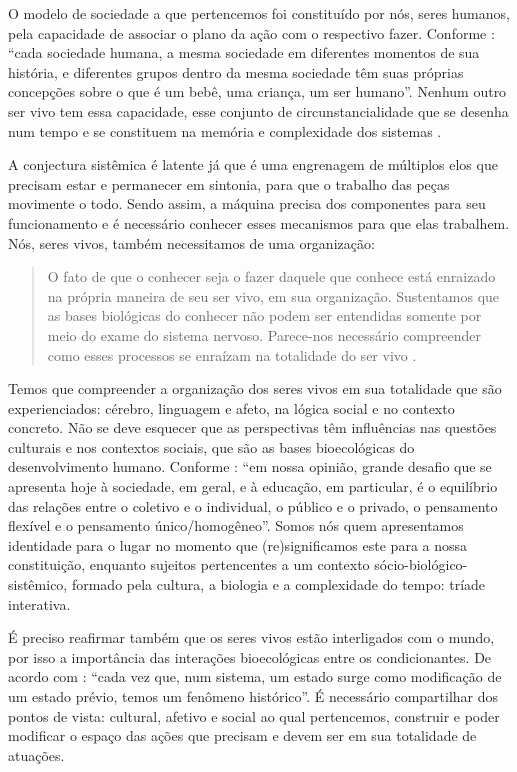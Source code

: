\documentclass{textolivre-html}
\begin{document}
O modelo de sociedade a que pertencemos foi constituído por nós, seres humanos, pela capacidade de associar o plano da ação com o respectivo fazer. Conforme \textcite[p. 91]{carvalho2012}: “cada sociedade humana, a mesma sociedade em diferentes momentos de sua história, e diferentes grupos dentro da mesma sociedade têm suas próprias concepções sobre o que é um bebê, uma criança, um ser humano”. Nenhum outro ser vivo tem essa capacidade, esse conjunto de circunstancialidade que se desenha num tempo e se constituem na memória e complexidade dos sistemas \cite{piske2019}. 

A conjectura sistêmica é latente já que é uma engrenagem de múltiplos elos que precisam estar e permanecer em sintonia, para que o trabalho das peças movimente o todo. Sendo assim, a máquina precisa dos componentes para seu funcionamento e é necessário conhecer esses mecanismos para que elas trabalhem. Nós, seres vivos, também necessitamos de uma organização:

\begin{quote}
O fato de que o conhecer seja o fazer daquele que conhece está enraizado na própria maneira de seu ser vivo, em sua organização. Sustentamos que as bases biológicas do conhecer não podem ser entendidas somente por meio do exame do sistema nervoso. Parece-nos necessário compreender como esses processos se enraízam na totalidade do ser vivo \cite[p. 40]{maturana2011}.
\end{quote}


Temos que compreender a organização dos seres vivos em sua totalidade que são experienciados: cérebro, linguagem e afeto, na lógica social e no contexto concreto. Não se deve esquecer que as perspectivas têm influências nas questões culturais e nos contextos sociais, que são as bases bioecológicas do desenvolvimento humano. Conforme \textcite[p. 31]{gomes2013}: “em nossa opinião, grande desafio que se apresenta hoje à sociedade, em geral, e à educação, em particular, é o equilíbrio das relações entre o coletivo e o individual, o público e o privado, o pensamento flexível e o pensamento único/homogêneo”. Somos nós quem apresentamos identidade para o lugar no momento que (re)significamos este para a nossa constituição, enquanto sujeitos pertencentes a um contexto sócio-biológico-sistêmico, formado pela cultura, a biologia e a complexidade do tempo: tríade interativa.

É preciso reafirmar também que os seres vivos estão interligados com o mundo, por isso a importância das interações bioecológicas entre os condicionantes. De acordo com \textcite[p. 67]{maturana2011}: “cada vez que, num sistema, um estado surge como modificação de um estado prévio, temos um fenômeno histórico”. É necessário compartilhar dos pontos de vista: cultural, afetivo e social ao qual pertencemos, construir e poder modificar o espaço das ações que precisam e devem ser em sua totalidade de atuações.
\end{document}
